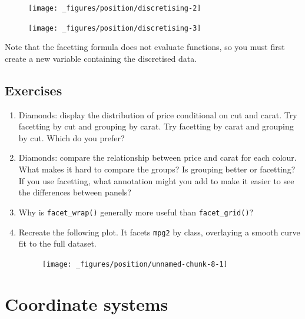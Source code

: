\begin{figure}[H]
  \texttt{[image: \_figures/position/discretising-2]}%
\end{figure}

\begin{Shaded}
\begin{Highlighting}[]
\StringTok{ } \NormalTok{)}
\end{Highlighting}
\end{Shaded}

\begin{figure}[H]
  \texttt{[image: \_figures/position/discretising-3]}
\end{figure}

Note that the facetting formula does not evaluate functions, so you must
first create a new variable containing the discretised data.

\subsection{Exercises}\label{exercises}

\begin{enumerate}
\def\labelenumi{\arabic{enumi}.}
\item
  Diamonds: display the distribution of price conditional on cut and
  carat. Try facetting by cut and grouping by carat. Try facetting by
  carat and grouping by cut. Which do you prefer?
\item
  Diamonds: compare the relationship between price and carat for each
  colour. What makes it hard to compare the groups? Is grouping better
  or facetting? If you use facetting, what annotation might you add to
  make it easier to see the differences between panels?
\item
  Why is \texttt{facet\_wrap()} generally more useful than
  \texttt{facet\_grid()}?
\item
  Recreate the following plot. It facets \texttt{mpg2} by class,
  overlaying a smooth curve fit to the full dataset.

  \begin{figure}[H]
    \centering
    \texttt{[image: \_figures/position/unnamed-chunk-8-1]}
  \end{figure}
\end{enumerate}

\hypertarget{sec:coord}{\section{Coordinate systems}\label{sec:coord}}

